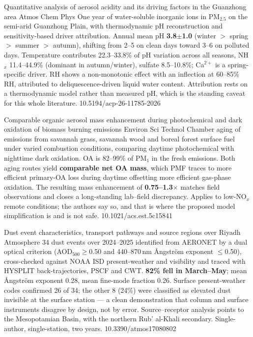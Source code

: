 \documentclass[10pt]{article}
\begin{document}
{Quantitative analysis of aerosol acidity and its driving factors in the Guanzhong area}
{Atmos Chem Phys}
{One year of water-soluble inorganic ions in PM$_{2.5}$ on the semi-arid Guanzhong Plain,
with thermodynamic pH reconstruction and sensitivity-based driver attribution. Annual
mean pH \textbf{3.8$\pm$1.0} (winter $>$ spring $>$ summer $>$ autumn), shifting from 2--5
on clean days toward 3--6 on polluted days. Temperature contributes 22.3--33.8\% of pH
variation across all seasons, NH$_x$ 11.4--44.9\% (dominant in autumn/winter), sulfate
8.5--10.8\%; Ca$^{2+}$ is a spring-specific driver. RH shows a non-monotonic effect with
an inflection at 60--85\% RH, attributed to deliquescence-driven liquid water content.
Attribution rests on a thermodynamic model rather than measured pH, which is the standing
caveat for this whole literature.}
{10.5194/acp-26-11785-2026}

{Comparable organic aerosol mass enhancement during photochemical and dark oxidation of biomass burning emissions}
{Environ Sci Technol}
{Chamber aging of emissions from savannah grass, savannah wood and boreal forest surface
fuel under varied combustion conditions, comparing daytime photochemical with nighttime
dark oxidation. OA is 82--99\% of PM$_1$ in the fresh emissions. Both aging routes yield
\textbf{comparable net OA mass}, which PMF traces to more efficient primary-OA loss during
daytime offsetting more efficient gas-phase oxidation. The resulting mass enhancement of
\textbf{0.75--1.3$\times$} matches field observations and closes a long-standing
lab--field discrepancy. Applies to low-NO$_x$ remote conditions; the authors say so, and
that is where the proposed model simplification is and is not safe.}
{10.1021/acs.est.5c15841}

{Dust event characteristics, transport pathways and source regions over Riyadh}
{Atmosphere}
{34 dust events over 2024--2025 identified from AERONET by a dual optical criterion
(AOD$_{500}\geq$0.50 and 440--870\,nm {\AA}ngstr\"om exponent $\leq$0.50), cross-checked
against NOAA ISD present-weather and visibility and traced with HYSPLIT back-trajectories,
PSCF and CWT. \textbf{82\% fell in March--May}; mean {\AA}ngstr\"om exponent 0.28, mean
fine-mode fraction 0.26. Surface present-weather codes confirmed 26 of 34; the other
8 (24\%) were classified as elevated dust invisible at the surface station --- a clean
demonstration that column and surface instruments disagree by design, not by error.
Source--receptor analysis points to the Mesopotamian Basin, with the northern
Rub' al-Khali secondary. Single-author, single-station, two years.}
{10.3390/atmos17080802}
\end{document}

